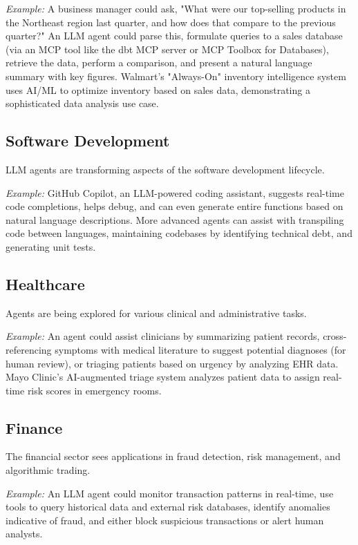 \textit{Example:} A business manager could ask, "What were our top-selling products in the Northeast region last quarter, and how does that compare to the previous quarter?" An LLM agent could parse this, formulate queries to a sales database (via an MCP tool like the dbt MCP server or MCP Toolbox for Databases), retrieve the data, perform a comparison, and present a natural language summary with key figures. Walmart's "Always-On" inventory intelligence system uses AI/ML to optimize inventory based on sales data, demonstrating a sophisticated data analysis use case.

\subsection{Software Development}
LLM agents are transforming aspects of the software development lifecycle.

\textit{Example:} GitHub Copilot, an LLM-powered coding assistant, suggests real-time code completions, helps debug, and can even generate entire functions based on natural language descriptions. More advanced agents can assist with transpiling code between languages, maintaining codebases by identifying technical debt, and generating unit tests.

\subsection{Healthcare}
Agents are being explored for various clinical and administrative tasks.

\textit{Example:} An agent could assist clinicians by summarizing patient records, cross-referencing symptoms with medical literature to suggest potential diagnoses (for human review), or triaging patients based on urgency by analyzing EHR data. Mayo Clinic's AI-augmented triage system analyzes patient data to assign real-time risk scores in emergency rooms.

\subsection{Finance}
The financial sector sees applications in fraud detection, risk management, and algorithmic trading.

\textit{Example:} An LLM agent could monitor transaction patterns in real-time, use tools to query historical data and external risk databases, identify anomalies indicative of fraud, and either block suspicious transactions or alert human analysts.

